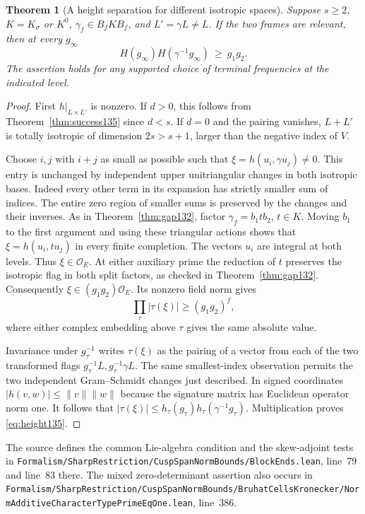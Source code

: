 \documentclass[a4paper,11pt]{article}
\newtheorem{theorem}[proposition]{Theorem}
\theoremstyle{definition}
\theoremstyle{remark}
\newcommand{\srcloc}[2]{{\small\nolinkurl{#1.lean}}, line~#2}
\numberwithin{equation}{section}
\begin{document}
\begin{theorem}[A height separation for different isotropic spaces]
\label{thm:height135}
Suppose \(s\ge2\), \(K=K_\sigma\) or \(K^0\),
\(\gamma_f\in B_f K B_f\), and \(L'=\gamma L\ne L\).
If the two frames are relevant, then at every \(g_\infty\)
\begin{equation}
              H(g_\infty)H(\gamma^{-1}g_\infty)\ \ge\ g_1g_2 .
              \label{eq:height135}
\end{equation}
The assertion holds for any supported choice of terminal
frequencies at the indicated level.
\end{theorem}
\begin{proof}
First \(h|_{L\times L'}\) is nonzero. If \(d>0\), this follows
from Theorem~\ref{thm:success135} since \(d<s\). If \(d=0\)
and the pairing vanishes, \(L+L'\) is totally isotropic of
dimension \(2s>s+1\), larger than the negative index of \(V\).

Choose \(i,j\) with \(i+j\) as small as possible such that
\(\xi=h(u_i,\gamma u_j)\ne0\). This entry is unchanged by
independent upper unitriangular changes in both isotropic bases.
Indeed every other term in its expansion has strictly smaller
sum of indices. The entire zero region of smaller sums is
preserved by the changes and their inverses. As in
Theorem~\ref{thm:gap132}, factor \(\gamma_f=b_1 t b_2\),
\(t\in K\). Moving \(b_1\) to the first argument and using
these triangular actions shows that \(\xi=h(u_i,t u_j)\)
in every finite completion. The vectors \(u_i\) are integral
at both levels. Thus \(\xi\in\mathcal O_E\). At either auxiliary
prime the reduction of \(t\) preserves the isotropic flag in
both split factors, as checked in Theorem~\ref{thm:gap132}.
Consequently \(\xi\in(g_1g_2)\mathcal O_E\). Its nonzero
field norm gives
\[
                   \prod_\tau|\tau(\xi)|\ge(g_1g_2)^f ,
\]
where either complex embedding above \(\tau\) gives the same
absolute value.

Invariance under \(g_\tau^{-1}\) writes \(\tau(\xi)\) as the
pairing of a vector from each of the two transformed flags
\(g_\tau^{-1}L, g_\tau^{-1}\gamma L\).
The same smallest-index observation permits the two independent
Gram--Schmidt changes just described. In signed coordinates
\(|h(v,w)|\le\|v\|\|w\|\) because the signature matrix has
Euclidean operator norm one. It follows that
\(|\tau(\xi)|\le h_\tau(g_\tau)h_\tau(\gamma^{-1}g_\tau)\).
Multiplication proves \eqref{eq:height135}.
\end{proof}

The source defines the common Lie-algebra condition and the
skew-adjoint tests in
\srcloc{Formalism/SharpRestriction/CuspSpanNormBounds/BlockEnds}{79}
and line~83 there. The mixed zero-determinant assertion also
occurs in
\srcloc{Formalism/SharpRestriction/CuspSpanNormBounds/BruhatCellsKronecker/NormAdditiveCharacterTypePrimeEqOne}{386}.
\end{document}
